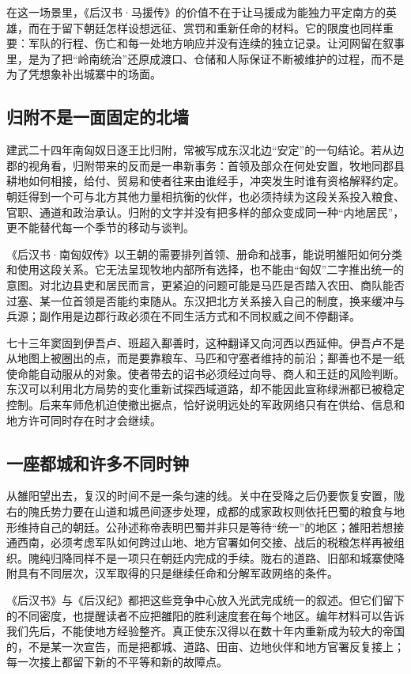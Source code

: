在这一场景里，《后汉书·马援传》的价值不在于让马援成为能独力平定南方的英雄，而在于留下朝廷怎样设想远征、赏罚和重新任命的材料。它的限度也同样重要：军队的行程、伤亡和每一处地方响应并没有连续的独立记录。让河网留在叙事里，是为了把“岭南统治”还原成渡口、仓储和人际保证不断被维护的过程，而不是为了凭想象补出城寨中的场面。

\subsection{归附不是一面固定的北墙}

建武二十四年南匈奴日逐王比归附，常被写成东汉北边“安定”的一句结论。若从边郡的视角看，归附带来的反而是一串新事务：首领及部众在何处安置，牧地同郡县耕地如何相接，给付、贸易和使者往来由谁经手，冲突发生时谁有资格解释约定。朝廷得到一个可与北方其他力量相抗衡的伙伴，也必须持续为这段关系投入粮食、官职、通道和政治承认。归附的文字并没有把多样的部众变成同一种“内地居民”，更不能替代每一个季节的移动与谈判。

《后汉书·南匈奴传》以王朝的需要排列首领、册命和战事，能说明雒阳如何分类和使用这段关系。它无法呈现牧地内部所有选择，也不能由“匈奴”二字推出统一的意图。对北边县吏和居民而言，更紧迫的问题可能是马匹是否踏入农田、商队能否过塞、某一位首领是否能约束随从。东汉把北方关系接入自己的制度，换来缓冲与兵源；副作用是边郡行政必须在不同生活方式和不同权威之间不停翻译。

七十三年窦固到伊吾卢、班超入鄯善时，这种翻译又向河西以西延伸。伊吾卢不是从地图上被圈出的点，而是要靠粮车、马匹和守塞者维持的前沿；鄯善也不是一纸使命能自动服从的对象。使者带去的诏书必须经过向导、商人和王廷的风险判断。东汉可以利用北方局势的变化重新试探西域道路，却不能因此宣称绿洲都已被稳定控制。后来车师危机迫使撤出据点，恰好说明远处的军政网络只有在供给、信息和地方许可同时存在时才会继续。

\subsection{一座都城和许多不同时钟}

从雒阳望出去，复汉的时间不是一条匀速的线。关中在受降之后仍要恢复安置，陇右的隗氏势力要在山道和城邑间逐步处理，成都的成家政权则依托巴蜀的粮食与地形维持自己的朝廷。公孙述称帝表明巴蜀并非只是等待“统一”的地区；雒阳若想接通西南，必须考虑军队如何跨过山地、地方官署如何交接、战后的税粮怎样再被组织。隗纯归降同样不是一项只在朝廷内完成的手续。陇右的道路、旧部和城寨使降附具有不同层次，汉军取得的只是继续任命和分解军政网络的条件。

《后汉书》与《后汉纪》都把这些竞争中心放入光武完成统一的叙述。但它们留下的不同密度，也提醒读者不应把雒阳的胜利速度套在每个地区。编年材料可以告诉我们先后，不能使地方经验整齐。真正使东汉得以在数十年内重新成为较大的帝国的，不是某一次宣告，而是把都城、道路、田亩、边地伙伴和地方官署反复接上；每一次接上都留下新的不平等和新的故障点。

